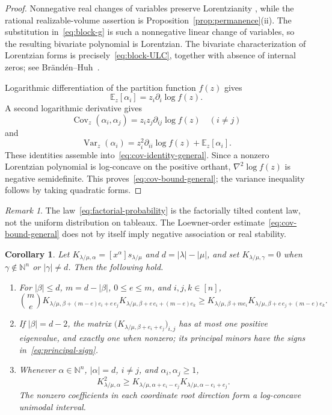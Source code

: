 \documentclass[11pt,a4paper,oneside]{amsart}
\numberwithin{equation}{section}
\newtheorem{corollary}[theorem]{Corollary}
\theoremstyle{definition}
\theoremstyle{remark}
\newtheorem{remark}[theorem]{Remark}
\DeclareMathOperator{\Cov}{Cov}
\DeclareMathOperator{\Var}{Var}
\newcommand{\N}{\mathbb N}
\begin{document}
\begin{proof}
Nonnegative real changes of variables preserve Lorentzianity
\cite[Theorem~2.10]{BH20}, while the rational realizable-volume assertion is
Proposition~\ref{prop:permanence}(ii).  The substitution in~\eqref{eq:block-g}
is such a nonnegative linear change of variables, so the resulting bivariate
polynomial is Lorentzian.  The bivariate characterization of Lorentzian forms is precisely~\eqref{eq:block-ULC}, together with absence of internal zeros; see Br\"and\'en--Huh~\cite[Example~2.26]{BH20}.

Logarithmic differentiation of the partition function $f(z)$ gives
\[
 \mathbb E_z[\alpha_i]=z_i\partial_i\log f(z).
\]
A second logarithmic derivative gives
\[
 \Cov_z(\alpha_i,\alpha_j)=z_iz_j\partial_{ij}\log f(z)
 \quad(i\neq j)
\]
and
\[
 \Var_z(\alpha_i)
 =z_i^2\partial_{ii}\log f(z)+\mathbb E_z[\alpha_i].
\]
These identities assemble into~\eqref{eq:cov-identity-general}.  Since a nonzero Lorentzian polynomial is log-concave on the positive orthant, $\nabla^2\log f(z)$ is negative semidefinite.  This proves~\eqref{eq:cov-bound-general}; the variance inequality follows by taking quadratic forms.
\end{proof}

\begin{remark}
The law~\eqref{eq:factorial-probability} is the factorially tilted content law, not the uniform distribution on tableaux.  The Loewner-order estimate~\eqref{eq:cov-bound-general} does not by itself imply negative association or real stability.
\end{remark}


\begin{corollary}\label{cor:ordinary-tableau-package}
Let $K_{\lambda/\mu,\alpha}=[x^\alpha]s_{\lambda/\mu}$ and $d=|\lambda|-|\mu|$, and set $K_{\lambda/\mu,\gamma}=0$ when $\gamma\notin\N^n$ or $|\gamma|\neq d$.  Then the following hold.
\begin{enumerate}[label=\textup{(\roman*)}]
\item For $|\beta|\leq d$, $m=d-|\beta|$, $0\leq e\leq m$, and $i,j,k\in[n]$,
\[
 \binom me
 K_{\lambda/\mu,\beta+(m-e)e_i+e\,e_j}
 K_{\lambda/\mu,\beta+e\,e_i+(m-e)e_k}
 \geq
 K_{\lambda/\mu,\beta+m e_i}
 K_{\lambda/\mu,\beta+e\,e_j+(m-e)e_k}.
\]
\item If $|\beta|=d-2$, the matrix
$\bigl(K_{\lambda/\mu,\beta+e_i+e_j}\bigr)_{i,j}$ has at most one positive eigenvalue, and exactly one when nonzero; its principal minors have the signs in~\eqref{eq:principal-sign}.
\item Whenever $\alpha\in\N^n$, $|\alpha|=d$, $i\neq j$, and $\alpha_i,\alpha_j\geq1$,
\[
 K_{\lambda/\mu,\alpha}^2
 \geq K_{\lambda/\mu,\alpha+e_i-e_j}
          K_{\lambda/\mu,\alpha-e_i+e_j}.
\]
The nonzero coefficients in each coordinate root direction form a log-concave unimodal interval.
\end{enumerate}
\end{corollary}
\end{document}
